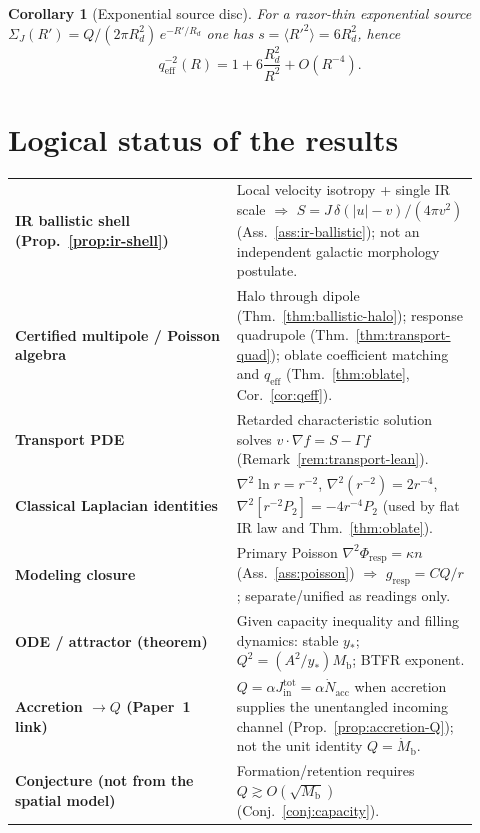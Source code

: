 \documentclass[11pt]{article}
\newtheorem{corollary}[theorem]{Corollary}
\theoremstyle{definition}
\theoremstyle{remark}
\newcommand{\Mb}{M_{\mathrm{b}}}
\newcommand{\qeff}{q_{\mathrm{eff}}}
\begin{document}
\begin{corollary}[Exponential source disc]
\label{cor:exp-disc}
For a razor-thin exponential source $\Sigma_{J}(R')=Q/(2\pi R_{d}^{2})\,e^{-R'/R_{d}}$ one has $s=\langle R'^{2}\rangle=6R_{d}^{2}$, hence
\begin{equation}
  \qeff^{-2}(R)=1+6\frac{R_{d}^{2}}{R^{2}}+O(R^{-4}).
\end{equation}
\end{corollary}

\section{Logical status of the results}
\label{sec:status}
\begin{center}
\small
\begin{tabular}{@{}p{0.44\linewidth}p{0.48\linewidth}@{}}
\toprule
\textbf{IR ballistic shell (Prop.~\ref{prop:ir-shell})} & Local velocity isotropy + single IR scale $\Rightarrow$ $S=J\,\delta(|u|-v)/(4\pi v^{2})$ (Ass.~\ref{ass:ir-ballistic}); not an independent galactic morphology postulate.\\
\textbf{Certified multipole / Poisson algebra} & Halo through dipole (Thm.~\ref{thm:ballistic-halo}); response quadrupole (Thm.~\ref{thm:transport-quad}); oblate coefficient matching and $\qeff$ (Thm.~\ref{thm:oblate}, Cor.~\ref{cor:qeff}).\\
\textbf{Transport PDE} & Retarded characteristic solution solves $v\cdot\nabla f=S-\Gamma f$ (Remark~\ref{rem:transport-lean}).\\
\textbf{Classical Laplacian identities} & $\nabla^{2}\ln r=r^{-2}$, $\nabla^{2}(r^{-2})=2r^{-4}$, $\nabla^{2}[r^{-2}P_{2}]=-4r^{-4}P_{2}$ (used by flat IR law and Thm.~\ref{thm:oblate}).\\
\textbf{Modeling closure} & Primary Poisson $\nabla^{2}\Phi_{\mathrm{resp}}=\kappa n$ (Ass.~\ref{ass:poisson}) $\Rightarrow$ $g_{\mathrm{resp}}=CQ/r$; separate/unified as readings only.\\
\textbf{ODE / attractor (theorem)} & Given capacity inequality and filling dynamics: stable $y_{\ast}$; $Q^{2}=(A^{2}/y_{\ast})\Mb$; BTFR exponent.\\
\textbf{Accretion $\to Q$ (Paper~1 link)} & $Q=\alpha J_{\mathrm{in}}^{\mathrm{tot}}=\alpha\dot N_{\mathrm{acc}}$ when accretion supplies the unentangled incoming channel (Prop.~\ref{prop:accretion-Q}); not the unit identity $Q=\dot\Mb$.\\
\textbf{Conjecture (not from the spatial model)} & Formation/retention requires $\boxed{Q\gtrsim O(\sqrt{\Mb})}$ (Conj.~\ref{conj:capacity}).\\

\end{tabular}
\end{center}
\end{document}
